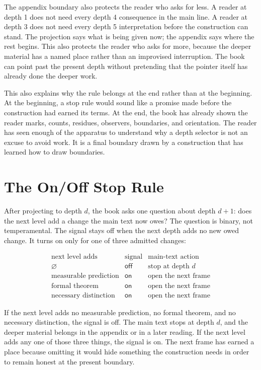 The appendix boundary also protects the reader who asks for less. A reader at
depth 1 does not need every depth 4 consequence in the main line. A reader at
depth 3 does not need every depth 5 interpretation before the construction can
stand. The projection says what is being given now; the appendix says where the
rest begins. This also protects the reader who asks for more, because the
deeper material has a named place rather than an improvised interruption. The
book can point past the present depth without pretending that the pointer itself
has already done the deeper work.

This also explains why the rule belongs at the end rather than at the
beginning. At the beginning, a stop rule would sound like a promise made before
the construction had earned its terms. At the end, the book has already shown
the reader marks, counts, residues, observers, boundaries, and orientation. The
reader has seen enough of the apparatus to understand why a depth selector is
not an excuse to avoid work. It is a final boundary drawn by a construction that
has learned how to draw boundaries.

\section{The On/Off Stop Rule}

After projecting to depth \(d\), the book asks one question about depth
\(d+1\): does the next level add a change the main text now owes? The question
is binary, not temperamental. The signal stays off when the next depth adds no
new owed change. It turns on only for one of three admitted changes:

\[
\begin{array}{c|c|c}
\text{next level adds} & \text{signal} & \text{main-text action} \\
\hline
\varnothing & \mathsf{off} & \text{stop at depth }d \\
\text{measurable prediction} & \mathsf{on} & \text{open the next frame} \\
\text{formal theorem} & \mathsf{on} & \text{open the next frame} \\
\text{necessary distinction} & \mathsf{on} & \text{open the next frame}
\end{array}
\]

If the next level adds no measurable prediction, no formal theorem, and no
necessary distinction, the signal is off. The main text stops at depth \(d\),
and the deeper material belongs in the appendix or in a later reading. If the
next level adds any one of those three things, the signal is on. The next frame
has earned a place because omitting it would hide something the construction
needs in order to remain honest at the present boundary.

